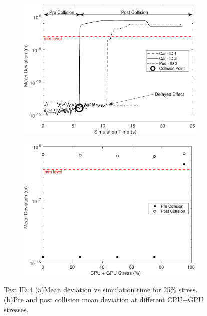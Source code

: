 \begin{figure}[h]
    \centering
    \begin{subfigure}{.49\textwidth}
        \includegraphics[width=1\textwidth]{Other/Figures/CarsPeopleCollsionsCG25.pdf}
        \caption{}
        \label{CarsPeopleCollsionsCG25}
    \end{subfigure}
    \begin{subfigure}{.49\textwidth}
        \includegraphics[width=1\textwidth]{Other/Figures/CarsPeopleCollisionPrePost.pdf}
        \caption{}
        \label{CarsPeopleCollisionPrePost}
    \end{subfigure}
    \caption{Test ID 4 (a)Mean deviation vs simulation time for 25\% stress. (b)Pre and post collision mean deviation at different CPU+GPU stresses.}
\end{figure}

